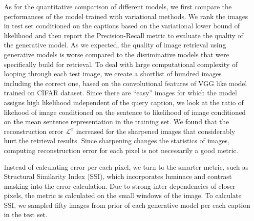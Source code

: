 \documentclass{article} %
\newcommand{\rloss}{\mathcal{L}^{x}}
\begin{document}
As for the quantitative comparison of different models, we first compare the performances of the model trained with variational methods. We rank the images in test set conditioned on the captions based on the variational lower bound of likelihood and then report the Precision-Recall metric to evaluate the quality of the generative model. As we expected, the quality of image retrieval using generative models is worse compared to the disriminative models that were specifically build for retrieval. To deal with large computational complexity of looping through each test image, we create a shortlist of hundred images including the correct one, based on the convolutional features of VGG like model trained on CIFAR dataset. Since there are ``easy'' images for which the model assigns high likelihood independent of the query caption, we look at the ratio of likehood of image conditioned on the sentence to likelihood of image conditioned on the mean sentence representation in the training set. We found that the reconstruction error $\rloss$ increased for the sharpened images that considerably hurt the retrieval results. Since sharpening changes the statistics of images, computing reconstruction error for each pixel is not necessarily a good metric.

Instead of calculating error per each pixel, we turn to the smarter metric, such as Structural Similarity Index (SSI), which incorporates luminace and contrast masking into the error calculation. Due to strong inter-dependencies of closer pixels, the metric is calculated on the small windows of the image. To calculate SSI, we sampled fifty images from prior of each generative model per each caption in the test set.
\end{document}
